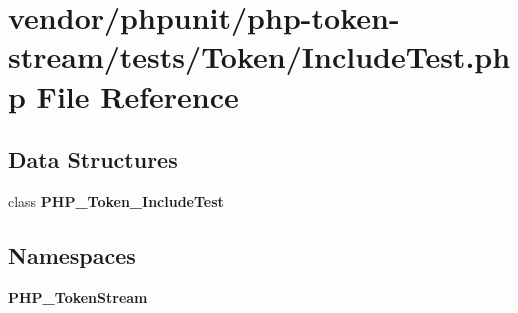 \section{vendor/phpunit/php-\/token-\/stream/tests/\+Token/\+Include\+Test.php File Reference}
\label{_include_test_8php}
\subsection*{Data Structures}
\begin{DoxyCompactItemize}
\item 
class {\bf P\+H\+P\+\_\+\+Token\+\_\+\+Include\+Test}
\end{DoxyCompactItemize}
\subsection*{Namespaces}
\begin{DoxyCompactItemize}
\item 
 {\bf P\+H\+P\+\_\+\+Token\+Stream}
\end{DoxyCompactItemize}
